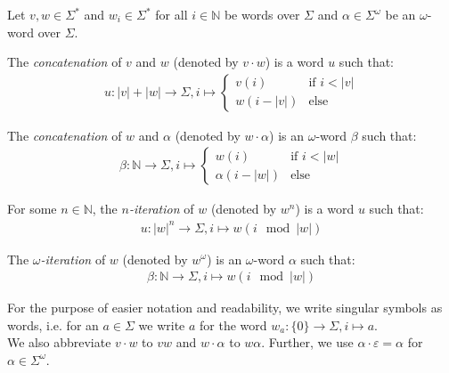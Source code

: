 \begin{defn}
	Let $v, w \in \Sigma^*$ and $w_i \in \Sigma^*$ for all $i \in \mathbb{N}$ be words over $\Sigma$ and $\alpha \in \Sigma^\omega$ be an $\omega$-word over $\Sigma$.
	
	The \emph{concatenation} of $v$ and $w$ (denoted by $v \cdot w$) is a word $u$ such that:
	\begin{align*}
	u : |v|+|w| \allowbreak \rightarrow \Sigma, i \mapsto 
	\begin{cases}
		v(i) & \text{if } i < |v| \\
		w(i-|v|) & \text{else}
	\end{cases}
	\end{align*}

	The \emph{concatenation} of $w$ and $\alpha$ (denoted by $w \cdot \alpha$) is an $\omega$-word $\beta$ such that:
	\begin{align*}
	\beta : \mathbb{N} \rightarrow \Sigma, i \mapsto 
	\begin{cases}
		w(i) & \text{if } i < |w| \\
		\alpha(i-|w|) & \text{else}
	\end{cases}
	\end{align*}
	
	For some $n \in \mathbb{N}$, the \emph{$n$-iteration} of $w$ (denoted by $w^n$) is a word $u$ such that:
	\begin{align*}
		u : |w|^n \rightarrow \Sigma, i \mapsto w(i \mod |w|)
	\end{align*}
	
	The \emph{$\omega$-iteration} of $w$ (denoted by $w^\omega$) is an $\omega$-word $\alpha$ such that:
	\begin{align*}
		\beta : \mathbb{N} \rightarrow \Sigma, i \mapsto w(i \mod |w|)
	\end{align*}
\end{defn}

\vspace{20pt}
For the purpose of easier notation and readability, we write singular symbols as words, i.e. for an $a \in \Sigma$ we write $a$ for the word $w_a : \{0\} \rightarrow \Sigma, i \mapsto a$.\\
We also abbreviate $v \cdot w$ to $vw$ and $w \cdot \alpha$ to $w \alpha$. Further, we use $\alpha \cdot \varepsilon = \alpha$ for $\alpha \in \Sigma^\omega$.
\vspace{10pt}

